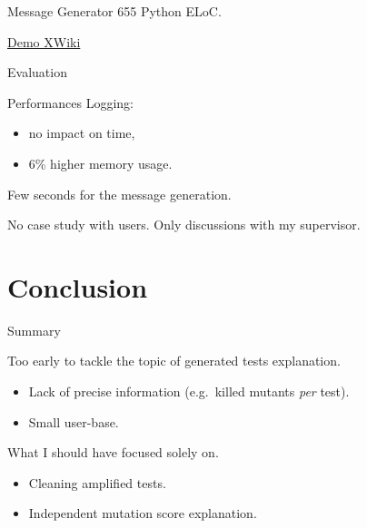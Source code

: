 \documentclass[aspectratio=169,dvipsnames]{beamer}
\begin{document}
\begin{frame}{Message Generator}
  655 Python ELoC.

  \href{https://github.com/sbihel/xwiki-commons/issues/2\#issuecomment-394699634}{Demo XWiki}
\end{frame}

\begin{frame}{Evaluation}
  \begin{block}{Performances}
    Logging:
    \begin{itemize}
      \item no impact on time,
      \item 6\% higher memory usage.
    \end{itemize}

    Few seconds for the message generation.
  \end{block}

  \pause{}

  No case study with users. Only discussions with my supervisor.
\end{frame}


\section*{Conclusion}

\begin{frame}{Summary}
  \begin{block}{Too early to tackle the topic of generated tests explanation.}
    \begin{itemize}
      \item Lack of precise information (e.g.\ killed mutants \textit{per} test).
      \item Small user-base.
    \end{itemize}
  \end{block}

  \pause{}

  \begin{block}{What I should have focused solely on.}
    \begin{itemize}
      \item Cleaning amplified tests.
      \item Independent mutation score explanation.
    \end{itemize}
  \end{block}
\end{frame}

\appendix
\end{document}
